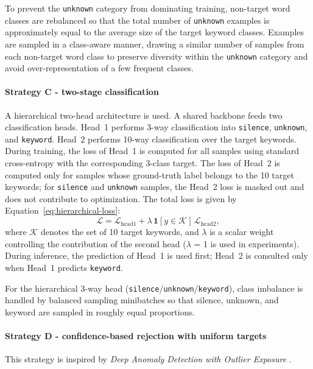 \documentclass[11pt]{article}
\begin{document}
To prevent the \texttt{unknown} category from dominating training, non-target word classes are rebalanced so that the total number of \texttt{unknown} examples is approximately equal to the average size of the target keyword classes. Examples are sampled in a class-aware manner, drawing a similar number of samples from each non-target word class to preserve diversity within the \texttt{unknown} category and avoid over-representation of a few frequent classes.

\paragraph*{Strategy C - two-stage classification}

A hierarchical two-head architecture is used. A shared backbone feeds two classification heads. Head~1 performs 3-way classification into \texttt{silence}, \texttt{unknown}, and \texttt{keyword}. Head~2 performs 10-way classification over the target keywords. During training, the loss of Head~1 is computed for all samples using standard cross-entropy with the corresponding 3-class target. The loss of Head~2 is computed only for samples whose ground-truth label belongs to the 10 target keywords; for \texttt{silence} and \texttt{unknown} samples, the Head~2 loss is masked out and does not contribute to optimization. The total loss is given by Equation~\eqref{eq:hierarchical-loss}:
\begin{equation}
\label{eq:hierarchical-loss}
\mathcal{L} = \mathcal{L}_{\text{head1}} + \lambda \,\mathbf{1}[y \in \mathcal{K}]\, \mathcal{L}_{\text{head2}},
\end{equation}
where \(\mathcal{K}\) denotes the set of 10 target keywords, and \(\lambda\) is a scalar weight controlling the contribution of the second head (\(\lambda\) = 1 is used in experiments). During inference, the prediction of Head~1 is used first; Head~2 is consulted only when Head~1 predicts \texttt{keyword}.

For the hierarchical 3-way head (\texttt{silence}/\texttt{unknown}/\texttt{keyword}), class imbalance is handled by balanced sampling minibatches so that silence, unknown, and keyword are sampled in roughly equal proportions.

\paragraph*{Strategy D - confidence-based rejection with uniform targets}

This strategy is inspired by \textit{Deep Anomaly Detection with Outlier Exposure} \cite{oe}.
\end{document}
